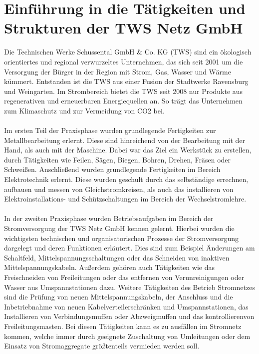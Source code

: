 \chapter{Einführung in die Tätigkeiten und Strukturen der TWS Netz GmbH}

Die Technischen Werke Schussental GmbH \& Co. KG (TWS) sind ein ökologisch orientiertes und regional verwurzeltes Unternehmen, das sich seit 2001 um die 
Versorgung der Bürger in der Region mit Strom, Gas, Wasser und Wärme kümmert. Entstanden ist die TWS aus einer Fusion der Stadtwerke Ravensburg und 
Weingarten. Im Strombereich bietet die TWS seit 2008 nur Produkte aus regenerativen und erneuerbaren Energiequellen an. So trägt das Unternehmen zum 
Klimaschutz und zur Vermeidung von CO2 bei.
\\\\
Im ersten Teil der Praxisphase wurden grundlegende Fertigkeiten zur Metallbearbeitung erlernt. Diese sind hinreichend von der Bearbeitung mit der Hand, 
als auch mit der Maschine. Dabei war das Ziel ein Werkstück zu erstellen, durch Tätigkeiten wie Feilen, Sägen, Biegen, Bohren, Drehen, Fräsen oder Schweißen. 
Anschließend wurden grundlegende Fertigkeiten im Bereich Elektrotechnik erlernt. Diese wurden geschult durch das selbständige errechnen, aufbauen und messen 
von Gleichstromkreisen, als auch das installieren von Elektroinstallations- und Schützschaltungen im Bereich der Wechselstromlehre.
\\\\
In der zweiten Praxisphase wurden Betriebsaufgaben im Bereich der Stromversorgung der TWS Netz GmbH kennen gelernt. Hierbei wurden die wichtigsten technischen
und organisatorischen Prozesse der Stromversorgung dargelegt und deren Funktionen erläutert. Dies sind zum Beispiel Änderungen am Schaltfeld, 
Mittelspannungsschaltungen oder das Schneiden von inaktiven Mittelspannungskabeln. Außerdem gehören auch Tätigkeiten wie das Freischneiden von Freileitungen 
oder das entfernen von Verunreinigungen oder Wasser aus Umspannstationen dazu. Weitere Tätigkeiten des Betrieb Stromnetzes sind die Prüfung von neuen 
Mittelspannungskabeln, der Anschluss und die Inbetriebnahme von neuen Kabelverteilerschränken und Umspannstationen, das Installieren von Verbindungsmuffen 
oder Abzweigmuffen und das kontrollierenvon Freileitungsmasten. Bei diesen Tätigkeiten kann es zu ausfällen im Stromnetz kommen, welche immer durch 
geeignete Zuschaltung von Umleitungen oder dem Einsatz von Stromaggregate größtenteils vermieden werden soll. 

\clearpage
